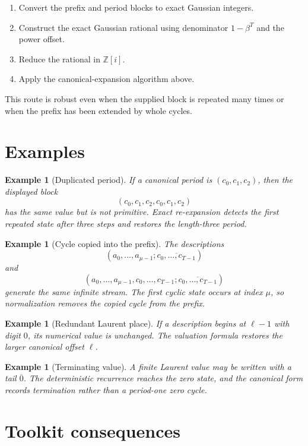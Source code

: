 \documentclass[11pt]{article}
\newtheorem{example}[theorem]{Example}
\theoremstyle{definition}
\newcommand{\Zi}{\mathbb{Z}[i]}
\begin{document}
\begin{enumerate}
\item Convert the prefix and period blocks to exact Gaussian integers.
\item Construct the exact Gaussian rational using denominator $1-\beta^T$ and the power offset.
\item Reduce the rational in $\Zi$.
\item Apply the canonical-expansion algorithm above.
\end{enumerate}

This route is robust even when the supplied block is repeated many times or when the prefix has been extended by whole cycles.

\section{Examples}

\begin{example}[Duplicated period]
If a canonical period is $(c_0,c_1,c_2)$, then the displayed block
\[
(c_0,c_1,c_2,c_0,c_1,c_2)
\]
has the same value but is not primitive.  Exact re-expansion detects the first repeated state after three steps and restores the length-three period.
\end{example}

\begin{example}[Cycle copied into the prefix]
The descriptions
\[
(a_0,\ldots,a_{\mu-1};\overline{c_0,\ldots,c_{T-1}})
\]
and
\[
(a_0,\ldots,a_{\mu-1},c_0,\ldots,c_{T-1};
\overline{c_0,\ldots,c_{T-1}})
\]
generate the same infinite stream.  The first cyclic state occurs at index $\mu$, so normalization removes the copied cycle from the prefix.
\end{example}

\begin{example}[Redundant Laurent place]
If a description begins at $\ell-1$ with digit $0$, its numerical value is unchanged.  The valuation formula restores the larger canonical offset $\ell$.
\end{example}

\begin{example}[Terminating value]
A finite Laurent value may be written with a tail $\overline{0}$.  The deterministic recurrence reaches the zero state, and the canonical form records termination rather than a period-one zero cycle.
\end{example}

\section{Toolkit consequences}
\end{document}
